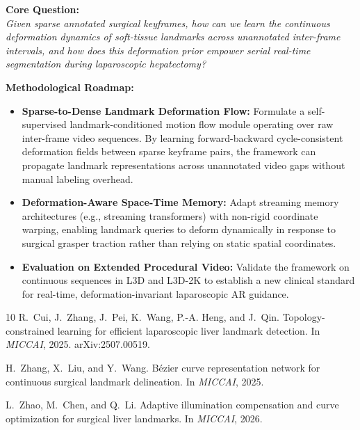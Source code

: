 \documentclass{article}
\begin{document}
\begin{proposalbox}
\textbf{Core Question:}\\
\emph{Given sparse annotated surgical keyframes, how can we learn the continuous deformation dynamics of soft-tissue landmarks across unannotated inter-frame intervals, and how does this deformation prior empower serial real-time segmentation during laparoscopic hepatectomy?}
\end{proposalbox}

\noindent\textbf{Methodological Roadmap:}
\begin{itemize}[leftmargin=18pt, topsep=3pt, itemsep=2pt]
    \item \textbf{Sparse-to-Dense Landmark Deformation Flow:} Formulate a self-supervised landmark-conditioned motion flow module operating over raw inter-frame video sequences. By learning forward-backward cycle-consistent deformation fields between sparse keyframe pairs, the framework can propagate landmark representations across unannotated video gaps without manual labeling overhead.
    \item \textbf{Deformation-Aware Space-Time Memory:} Adapt streaming memory architectures (e.g., streaming transformers) with non-rigid coordinate warping, enabling landmark queries to deform dynamically in response to surgical grasper traction rather than relying on static spatial coordinates.
    \item \textbf{Evaluation on Extended Procedural Video:} Validate the framework on continuous sequences in L3D and L3D-2K to establish a new clinical standard for real-time, deformation-invariant laparoscopic AR guidance.
\end{itemize}

\begin{thebibliography}{10}
\small
{}
R.~Cui, J.~Zhang, J.~Pei, K.~Wang, P.-A. Heng, and J.~Qin.
\newblock Topology-constrained learning for efficient laparoscopic liver landmark detection.
\newblock In {\em MICCAI}, 2025. arXiv:2507.00519.

H.~Zhang, X.~Liu, and Y.~Wang.
\newblock B{\'e}zier curve representation network for continuous surgical landmark delineation.
\newblock In {\em MICCAI}, 2025.

L.~Zhao, M.~Chen, and Q.~Li.
\newblock Adaptive illumination compensation and curve optimization for surgical liver landmarks.
\newblock In {\em MICCAI}, 2026.
\end{thebibliography}
\end{document}
